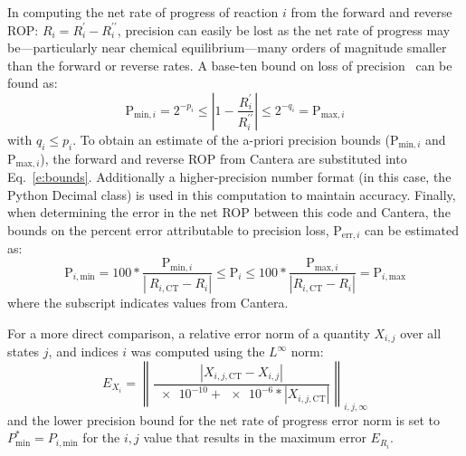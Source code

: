 \documentclass[12pt]{ussci}
\begin{document}
In computing the net rate of progress of reaction $i$ from the forward and reverse ROP: $R_{i} = R_{i}^{\prime} - R_{i}^{\prime\prime}$, precision can easily be lost as the net rate of progress may be---particularly near chemical equilibrium---many orders of magnitude smaller than the forward or reverse rates.
A base-ten bound on loss of precision~\cite{goldberg1991every} can be found as:
\begin{equation}
\text{P}_{\text{min},i} = 2^{-p_i} \le \left\lvert 1 - \frac{R_{i}^{\prime}}{R_{i}^{\prime\prime}} \right\rvert \le 2^{-q_i} = \text{P}_{\text{max},i}
\label{e:bounds}
\end{equation}
with $q_i \le p_i$.
To obtain an estimate of the a-priori precision bounds ($\text{P}_{\text{min},i}$ and $\text{P}_{\text{max},i}$), the forward and reverse ROP from Cantera are substituted into Eq.~\eqref{e:bounds}.
Additionally a higher-precision number format (in this case, the Python Decimal class) is used in this computation to maintain accuracy.
Finally, when determining the error in the net ROP between this code and Cantera, the bounds on the percent error attributable to precision loss, $\text{P}_{\text{err},i}$ can be estimated as:
\begin{equation}
\text{P}_{i,\text{min}} = 100 * \frac{\text{P}_{\text{min},i}}{\left\lvert\ R_{i,\text{CT}} - R_{i}\right\rvert} \le
\text{P}_{i} \le 100 * \frac{\text{P}_{\text{max},i}}{\left\lvert R_{i,\text{CT}} - R_{i} \right\rvert} = \text{P}_{i,\text{max}}
\label{e:rel_bound}
\end{equation}
where the  subscript indicates values from Cantera.

For a more direct comparison, a relative error norm of a quantity $X_{i,j}$ over all states $j$, and indices $i$ was computed using the $L^{\infty}$ norm:
\begin{equation}
 E_{X_{i}} = \left\lVert \frac{\left\lvert X_{i,j,\text{CT}} - X_{i,j}\right\rvert}{\num{e-10} + \num{e-6} * \left\lvert X_{i,j,\text{CT}} \right\rvert} \right\rVert_{i,j,\infty}
\label{e:rel_err}
\end{equation}
and the lower precision bound for the net rate of progress error norm is set to $P_{\text{min}}^{*} = P_{i,\text{min}}$ for the $i, j$ value that results in the maximum error $E_{R_i}$.
\end{document}
